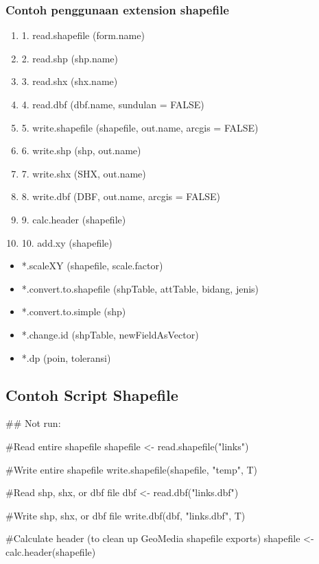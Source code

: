\subsubsection{Contoh penggunaan extension shapefile}
\begin{enumerate}
    \item 1. read.shapefile (form.name) 
    \item 2. read.shp (shp.name) 
    \item 3. read.shx (shx.name)
    \item 4. read.dbf (dbf.name, sundulan = FALSE)
    \item 5. write.shapefile (shapefile, out.name, arcgis = FALSE) 
    \item 6. write.shp (shp, out.name) 
    \item 7. write.shx (SHX, out.name)
    \item 8. write.dbf (DBF, out.name, arcgis = FALSE) 
    \item 9. calc.header (shapefile) 
    \item 10. add.xy (shapefile)
\end{enumerate}
\begin{itemize}
    \item *.scaleXY (shapefile, scale.factor)
    \item *.convert.to.shapefile (shpTable, attTable, bidang, jenis) 
    \item *.convert.to.simple (shp)
    \item *.change.id (shpTable, newFieldAsVector) 
    \item *.dp (poin, toleransi)
\end{itemize}

\subsection{Contoh Script Shapefile}

## Not run: 

#Read entire shapefile 
shapefile <- read.shapefile("links") 

#Write entire shapefile 
write.shapefile(shapefile, "temp", T) 

#Read shp, shx, or dbf file 
dbf <- read.dbf("links.dbf") 

#Write shp, shx, or dbf file 
write.dbf(dbf, "links.dbf", T) 

#Calculate header (to clean up GeoMedia shapefile exports) 
shapefile <- calc.header(shapefile) 

